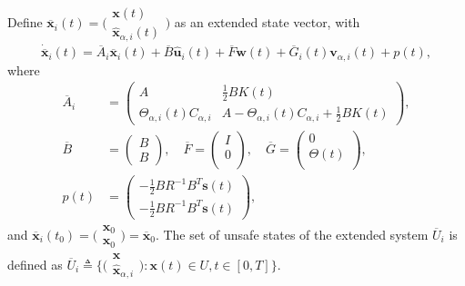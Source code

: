 \documentclass[journal]{IEEEtran}
\begin{document}
Define $\overline{\mathbf{x}}_i(t) = \big(
\begin{smallmatrix}
\mathbf{x}(t) \\
\hat{\mathbf{x}}_{\alpha,i}(t)
\end{smallmatrix}
\big)$ as an extended state vector, with $$\dot{\overline{\mathbf{x}}}_i(t) = \overline{A}_i\overline{\mathbf{x}}_i(t) + \overline{B}\hat{\mathbf{u}}_i(t) + \overline{F}\mathbf{w}(t) + \overline{G}_i(t)\mathbf{v}_{\alpha,i}(t)+p(t),$$ where
\begin{subequations}
    \begin{align*}
        \overline{A}_i &= \begin{pmatrix}A & \frac{1}{2}BK(t) \\
        \Theta_{\alpha,i}(t)C_{\alpha,i} & A-\Theta_{\alpha,i}(t) C_{\alpha,i} + \frac{1}{2}BK(t)\end{pmatrix},\\
        \overline{B} &= \begin{pmatrix}B\\B\end{pmatrix}, \quad
        \overline{F} = \begin{pmatrix}I \\0 \\\end{pmatrix}, \quad \overline{G} = \begin{pmatrix}0 \\\Theta(t) \\\end{pmatrix},\\
        p(t) &= \begin{pmatrix}    -\frac{1}{2}BR^{-1}B^T\mathbf{s}(t) \\-\frac{1}{2}BR^{-1}B^T\mathbf{s}(t) \end{pmatrix},
    \end{align*}
\end{subequations}
and $\overline{\mathbf{x}}_i(t_0) = \big(
\begin{smallmatrix}
\mathbf{x}_0 \\
\mathbf{x}_0
\end{smallmatrix}
\big) = \overline{\mathbf{x}}_0$. The set of unsafe states of the extended system $\overline{U}_i$ is defined as 
$\overline{U}_i \triangleq \{\big(
\begin{smallmatrix}
\mathbf{x} \\
\hat{\mathbf{x}}_{\alpha,i}
\end{smallmatrix}
\big): \mathbf{x}(t) \in U, t \in [0, T]\}.$
\end{document}
